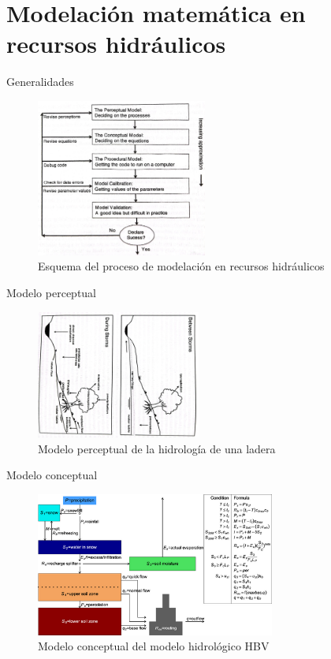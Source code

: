 \documentclass[
10pt,
aspectratio=169,
]{beamer}
\begin{document}
\section{Modelaci\'on matem\'atica en recursos hidr\'aulicos}
\begin{frame}{Generalidades}
\vspace{-0.2cm}
\begin{figure}
\centering
\includegraphics[width=0.5\textwidth]{f5mod.jpeg}
\caption{Esquema del proceso de modelaci\'on en recursos hidráulicos}
\end{figure}
\end{frame}

\begin{frame}{Modelo perceptual}
\vspace{-0.2cm}
\begin{figure}
\centering
\includegraphics[width=0.48\textwidth,angle=90]{f6mod.jpeg}
\caption{Modelo perceptual de la hidrología de una ladera}
\end{figure}
\end{frame}

\begin{frame}{Modelo conceptual}
\vspace{-0.2cm}
\begin{figure}
\centering
\includegraphics[width=0.7\textwidth]{f7mod.png}
\caption{Modelo conceptual del modelo hidrológico HBV}
\end{figure}
\end{frame}
\end{document}
